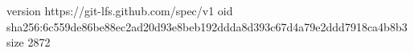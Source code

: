 version https://git-lfs.github.com/spec/v1
oid sha256:6c559de86be88ec2ad20d93e8beb192ddda8d393c67d4a79e2ddd7918ca4b8b3
size 2872
